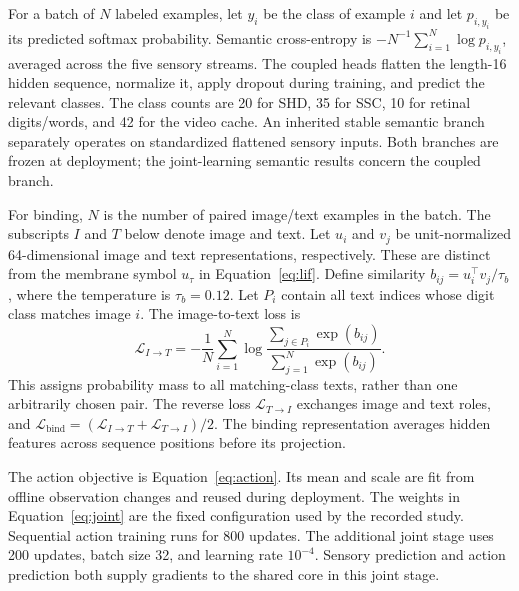 For a batch of $N$ labeled examples, let $y_i$ be the class of example $i$
and let $p_{i,y_i}$ be its predicted softmax probability. Semantic cross-entropy
is $-N^{-1}\sum_{i=1}^N\log p_{i,y_i}$, averaged across the five sensory
streams. The coupled heads flatten the length-16 hidden sequence, normalize
it, apply dropout during training, and predict the relevant classes. The
class counts are 20 for SHD, 35 for SSC, 10 for retinal digits/words, and 42
for the video cache. An inherited stable semantic branch separately operates
on standardized flattened sensory inputs. Both branches are frozen at
deployment; the joint-learning semantic results concern the coupled branch.

For binding, $N$ is the number of paired image/text examples in the batch.
The subscripts $I$ and $T$ below denote image and text. Let $u_i$ and $v_j$ be
unit-normalized 64-dimensional image and
text representations, respectively. These are distinct from the membrane
symbol $u_\tau$ in Equation~\eqref{eq:lif}. Define similarity
$b_{ij}=u_i^\top v_j/\tau_b$, where the temperature is $\tau_b=0.12$.
Let $P_i$ contain all text indices whose digit class matches image $i$.
The image-to-text loss is
\begin{equation}
 \mathcal L_{I\rightarrow T}=-\frac1N\sum_{i=1}^N
 \log\frac{\sum_{j\in P_i}\exp(b_{ij})}{\sum_{j=1}^N\exp(b_{ij})}.
\end{equation}
This assigns probability mass to all matching-class texts, rather than one
arbitrarily chosen pair. The reverse loss $\mathcal L_{T\rightarrow I}$
exchanges image and text roles, and
$\mathcal L_{\mathrm{bind}}=(\mathcal L_{I\rightarrow T}+\mathcal L_{T\rightarrow I})/2$.
The binding representation averages hidden features across sequence positions
before its projection.

The action objective is Equation~\eqref{eq:action}. Its mean and scale are
fit from offline observation changes and reused during deployment. The
weights in Equation~\eqref{eq:joint} are the fixed configuration used by the
recorded study. Sequential action training runs for 800 updates. The additional
joint stage uses 200 updates, batch size 32, and learning rate $10^{-4}$.
Sensory prediction and action prediction both supply gradients to the shared
core in this joint stage.
